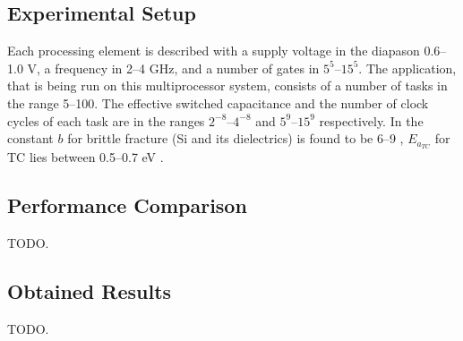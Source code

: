 \subsection{Experimental Setup}
Each processing element is described with a supply voltage in the diapason 0.6--1.0 V, a frequency in 2--4 GHz, and a number of gates in $5^5$--$15^5$. The application, that is being run on this multiprocessor system, consists of a number of tasks in the range 5--100. The effective switched capacitance and the number of clock cycles of each task are in the ranges $2^{-8}$--$4^{-8}$ and $5^9$--$15^9$ respectively. In  the constant $b$ for brittle fracture (Si and its dielectrics) is found to be 6--9 \cite{jedec2010}, $E_{a_{TC}}$ for TC lies between 0.5--0.7 eV \cite{vigrass}.

\subsection{Performance Comparison} \label{sec:comparison}
TODO.

\subsection{Obtained Results}
TODO.
